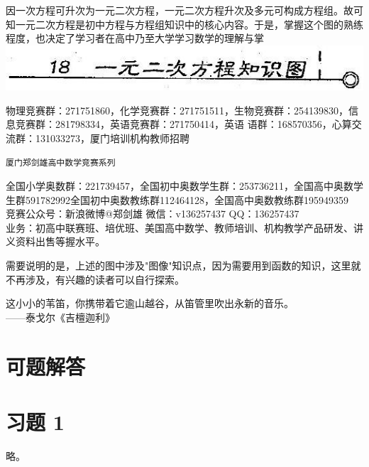 \documentclass[10pt]{article}
\begin{document}
因一次方程可升次为一元二次方程，一元二次方程升次及多元可构成方程组。故可知一元二次方程是初中方程与方程组知识中的核心内容。于是，掌握这个图的熟练程度，也决定了学习者在高中乃至大学学习数学的理解与掌\\
\includegraphics[max width=\textwidth, center]{2024_10_30_26b590fd1106d28139f0g-123}

物理竞赛群：271751860，化学竞赛群：271751511，生物竞赛群：254139830，信息竞赛群：281798334，英语竞赛群：271750414，英语 语群：168570356，心算交流群：131033273，厦门培训机构教师招聘

\begin{verbatim}
厦门郑剑雄高中数学竞赛系列
\end{verbatim}

全国小学奥数群：221739457，全国初中奥数学生群：253736211，全国高中奥数学生群591782992全国初中奥数教练群112464128，全国高中奥数教练群195949359\\
竞赛公众号：新浪微博@郑剑雄 微信：v136257437 QQ：136257437\\
业务：初高中联赛班、培优班、美国高中数学、教师培训、机构教学产品研发、讲义资料出售等握水平。

需要说明的是，上述的图中涉及"图像"知识点，因为需要用到函数的知识，这里就不再涉及，有兴趣的读者可以自行探索。

这小小的苇笛，你携带着它逾山越谷，从笛管里吹出永新的音乐。\\
——泰戈尔《吉檀迦利》

\section*{可题解答}
\section*{习题 1}
略。
\end{document}
